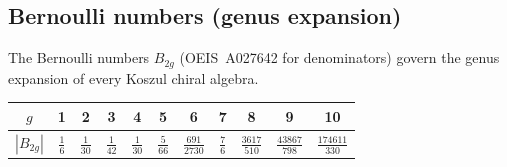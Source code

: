 \subsection{Bernoulli numbers (genus expansion)}
\label{subsec:bernoulli}

The Bernoulli numbers $B_{2g}$ (OEIS~A027642 for denominators) govern the genus expansion of every Koszul chiral algebra.

\begin{center}
\renewcommand{\arraystretch}{1.2}
\begin{tabular}{c|cccccccccc}
$g$ & 1 & 2 & 3 & 4 & 5 & 6 & 7 & 8 & 9 & 10 \\
\hline
$|B_{2g}|$ & $\tfrac{1}{6}$ & $\tfrac{1}{30}$ & $\tfrac{1}{42}$ & $\tfrac{1}{30}$ & $\tfrac{5}{66}$ & $\tfrac{691}{2730}$ & $\tfrac{7}{6}$ & $\tfrac{3617}{510}$ & $\tfrac{43867}{798}$ & $\tfrac{174611}{330}$
\end{tabular}
\end{center}

